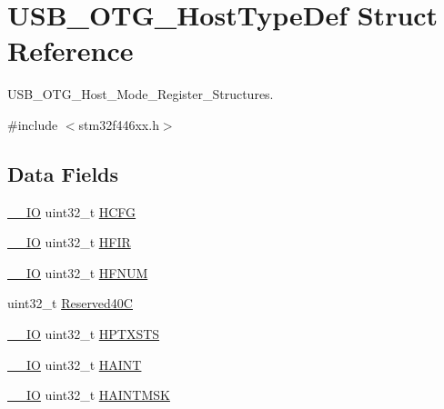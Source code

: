 \hypertarget{struct_u_s_b___o_t_g___host_type_def}{}\section{U\+S\+B\+\_\+\+O\+T\+G\+\_\+\+Host\+Type\+Def Struct Reference}
\label{struct_u_s_b___o_t_g___host_type_def}


U\+S\+B\+\_\+\+O\+T\+G\+\_\+\+Host\+\_\+\+Mode\+\_\+\+Register\+\_\+\+Structures.  




{\ttfamily \#include $<$stm32f446xx.\+h$>$}

\subsection*{Data Fields}
\begin{DoxyCompactItemize}
\item 
\mbox{\hyperlink{core__sc300_8h_aec43007d9998a0a0e01faede4133d6be}{\+\_\+\+\_\+\+IO}} uint32\+\_\+t \mbox{\hyperlink{struct_u_s_b___o_t_g___host_type_def_aa15bc4ab9217b295560dbda2235c745a}{H\+C\+FG}}
\item 
\mbox{\hyperlink{core__sc300_8h_aec43007d9998a0a0e01faede4133d6be}{\+\_\+\+\_\+\+IO}} uint32\+\_\+t \mbox{\hyperlink{struct_u_s_b___o_t_g___host_type_def_a0a6f11662e44ad485cc869f49e5aa9c9}{H\+F\+IR}}
\item 
\mbox{\hyperlink{core__sc300_8h_aec43007d9998a0a0e01faede4133d6be}{\+\_\+\+\_\+\+IO}} uint32\+\_\+t \mbox{\hyperlink{struct_u_s_b___o_t_g___host_type_def_a6a141fc0dab9ee8930465a2da604420f}{H\+F\+N\+UM}}
\item 
uint32\+\_\+t \mbox{\hyperlink{struct_u_s_b___o_t_g___host_type_def_af66e42cdb83dc2eb156dfbbf42890f79}{Reserved40C}}
\item 
\mbox{\hyperlink{core__sc300_8h_aec43007d9998a0a0e01faede4133d6be}{\+\_\+\+\_\+\+IO}} uint32\+\_\+t \mbox{\hyperlink{struct_u_s_b___o_t_g___host_type_def_a3903a00940c32a9f09889e08881e7a6a}{H\+P\+T\+X\+S\+TS}}
\item 
\mbox{\hyperlink{core__sc300_8h_aec43007d9998a0a0e01faede4133d6be}{\+\_\+\+\_\+\+IO}} uint32\+\_\+t \mbox{\hyperlink{struct_u_s_b___o_t_g___host_type_def_a9fb9e43255829e50b9e5416d58ae11be}{H\+A\+I\+NT}}
\item 
\mbox{\hyperlink{core__sc300_8h_aec43007d9998a0a0e01faede4133d6be}{\+\_\+\+\_\+\+IO}} uint32\+\_\+t \mbox{\hyperlink{struct_u_s_b___o_t_g___host_type_def_a4d431ac4a59cbb89ed82a6c6cf9dfc39}{H\+A\+I\+N\+T\+M\+SK}}
\end{DoxyCompactItemize}


